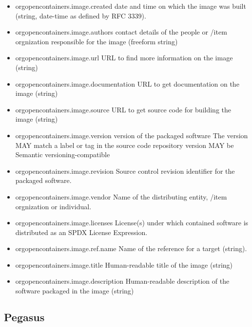 \begin{itemize}
   \item orgopencontainers.image.created date and time on which the image was built (string, date-time as defined by RFC 3339).
    \item orgopencontainers.image.authors contact details of the people or /item orgnization responsible for the image (freeform string)
    \item orgopencontainers.image.url URL to find more information on the image (string)
    \item orgopencontainers.image.documentation URL to get documentation on the image (string)
    \item orgopencontainers.image.source URL to get source code for building the image (string)
    \item orgopencontainers.image.version version of the packaged software
        The version MAY match a label or tag in the source code repository
        version MAY be Semantic versioning-compatible
    \item orgopencontainers.image.revision Source control revision identifier for the packaged software.
    \item orgopencontainers.image.vendor Name of the distributing entity, /item orgnization or individual.
    \item orgopencontainers.image.licenses License(s) under which contained software is distributed as an SPDX License Expression.
    \item orgopencontainers.image.ref.name Name of the reference for a target (string).  

    \item orgopencontainers.image.title Human-readable title of the image (string)
    \item orgopencontainers.image.description Human-readable description of the software packaged in the image (string)
\end{itemize}


\subsection{Pegasus}

